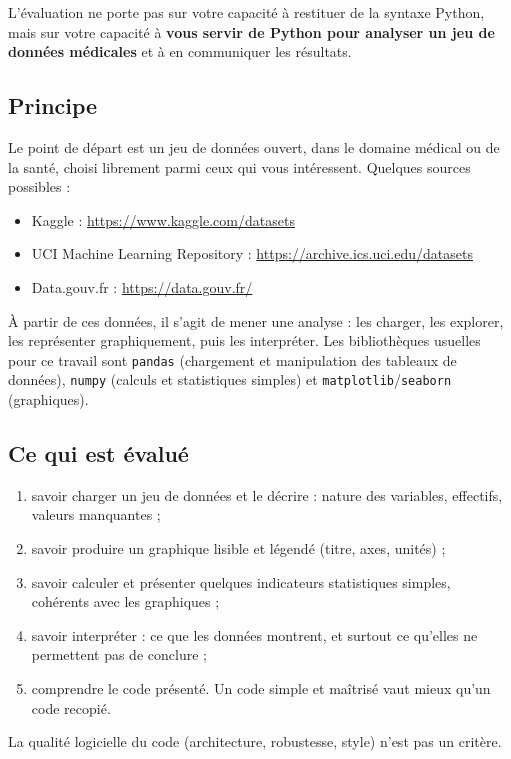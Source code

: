 \documentclass[a4paper,12pt]{article}
\begin{document}
\begin{leftbar}
L'évaluation ne porte pas sur votre capacité à restituer de la syntaxe Python, mais sur votre capacité à \textbf{vous servir de Python pour analyser un jeu de données médicales} et à en communiquer les résultats.
\end{leftbar}

\subsection{Principe}
Le point de départ est un jeu de données ouvert, dans le domaine médical ou de la santé, choisi librement parmi ceux qui vous intéressent. Quelques sources possibles :
\begin{itemize}
\item Kaggle : \url{https://www.kaggle.com/datasets}
\item UCI Machine Learning Repository : \url{https://archive.ics.uci.edu/datasets}
\item Data.gouv.fr : \url{https://data.gouv.fr/}
\end{itemize}
À partir de ces données, il s'agit de mener une analyse : les charger, les explorer, les représenter graphiquement, puis les interpréter. Les bibliothèques usuelles pour ce travail sont \texttt{pandas} (chargement et manipulation des tableaux de données), \texttt{numpy} (calculs et statistiques simples) et \texttt{matplotlib}/\texttt{seaborn} (graphiques).

\subsection{Ce qui est évalué}
\begin{enumerate}
\item savoir charger un jeu de données et le décrire : nature des variables, effectifs, valeurs manquantes ;
\item savoir produire un graphique lisible et légendé (titre, axes, unités) ;
\item savoir calculer et présenter quelques indicateurs statistiques simples, cohérents avec les graphiques ;
\item savoir interpréter : ce que les données montrent, et surtout ce qu'elles ne permettent pas de conclure ;
\item comprendre le code présenté. Un code simple et maîtrisé vaut mieux qu'un code recopié.
\end{enumerate}
La qualité logicielle du code (architecture, robustesse, style) n'est pas un critère.
\end{document}
